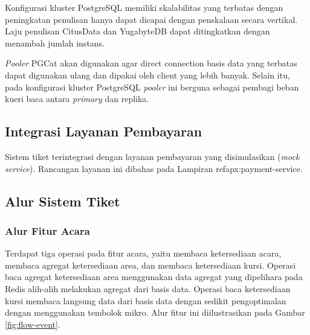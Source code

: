 Konfigurasi kluster PostgreSQL memiliki skalabilitas yang terbatas dengan peningkatan penulisan hanya dapat dicapai dengan penskalaan secara vertikal. Laju penulisan CitusData dan YugabyteDB dapat ditingkatkan dengan menambah jumlah instans.

\textit{Pooler} PGCat akan digunakan agar direct connection basis data yang terbatas dapat digunakan ulang dan dipakai oleh client yang lebih banyak. Selain itu, pada konfigurasi kluster PostgreSQL \textit{pooler} ini berguna sebagai pembagi beban kueri baca antara \textit{primary} dan replika.

\subsection{Integrasi Layanan Pembayaran}

Sistem tiket terintegrasi dengan layanan pembayaran yang disimulasikan (\textit{mock service}). Rancangan layanan ini dibahas pada Lampiran ref{apx:payment-service}.

\subsection{Alur Sistem Tiket}

\subsubsection{Alur Fitur Acara}

Terdapat tiga operasi pada fitur acara, yaitu membaca ketersediaan acara, membaca agregat ketersediaan area, dan membaca ketersediaan kursi. Operasi baca agregat ketersediaan area menggunakan data agregat yang dipelihara pada Redis alih-alih melakukan agregat dari basis data. Operasi baca ketersediaan kursi membaca langsung data dari basis data dengan sedikit pengoptimalan dengan menggunakan tembolok mikro. Alur fitur ini diilustrasikan pada Gambar \ref{fig:flow-event}.

